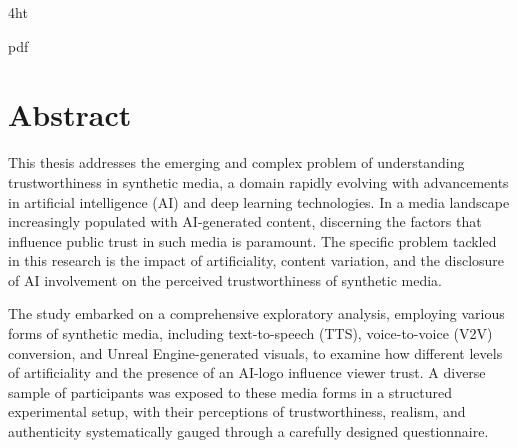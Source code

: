 \documentclass[
  a4paper,  %
  twoside,  %
  bibliography=totoc,
  headsepline,
  cleardoublepage=empty,
  parskip=half,
  draft=false
]{scrbook}
\begin{document}
\frontmatter
{} %
\setcounter{tocdepth}{2} %



\iftex4ht
  \Configure{$}{\PicMath}{\EndPicMath}{}

  {pdf}
  {%
  }
\fi



\Coverpage
\Copyright
\pagestyle{preamble}
\renewcommand*{\chapterpagestyle}{preamble}




\section*{Abstract}

This thesis addresses the emerging and complex problem of understanding trustworthiness in synthetic media, a domain rapidly evolving with advancements in artificial intelligence (AI) and deep learning technologies. In a media landscape increasingly populated with AI-generated content, discerning the factors that influence public trust in such media is paramount. The specific problem tackled in this research is the impact of artificiality, content variation, and the disclosure of AI involvement on the perceived trustworthiness of synthetic media.

The study embarked on a comprehensive exploratory analysis, employing various forms of synthetic media, including text-to-speech (TTS), voice-to-voice (V2V) conversion, and Unreal Engine-generated visuals, to examine how different levels of artificiality and the presence of an AI-logo influence viewer trust. A diverse sample of participants was exposed to these media forms in a structured experimental setup, with their perceptions of trustworthiness, realism, and authenticity systematically gauged through a carefully designed questionnaire.
\end{document}
